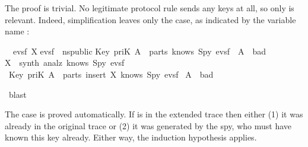 \begin{isabellebody}
\begin{isamarkuptxt}
The proof is trivial.  No legitimate protocol rule sends any keys
at all, so only  is relevant. Indeed, simplification leaves
only the  case, as indicated by the variable name :
\begin{isabelle}%
\ {}{\isachardot}\ {\isasymAnd}evsf\ X{\isachardot}\isanewline
{}evsf\ {\isasymin}\ ns{\isacharunderscore}public{\isacharsemicolon}\isanewline
{}Key\ {\isacharparenleft}priK\ A{\isacharparenright}\ {\isasymin}\ parts\ {\isacharparenleft}knows\ Spy\ evsf{\isacharparenright}{\isacharparenright}\ {\isacharequal}\ {\isacharparenleft}A\ {\isasymin}\ bad{\isacharparenright}{\isacharsemicolon}\isanewline
{}X\ {\isasymin}\ synth\ {\isacharparenleft}analz\ {\isacharparenleft}knows\ Spy\ evsf{\isacharparenright}{\isacharparenright}{\isasymrbrakk}\isanewline
{}\ {\isacharparenleft}Key\ {\isacharparenleft}priK\ A{\isacharparenright}\ {\isasymin}\ parts\ {\isacharparenleft}insert\ X\ {\isacharparenleft}knows\ Spy\ evsf{\isacharparenright}{\isacharparenright}{\isacharparenright}\ {\isacharequal}\isanewline
{}A\ {\isasymin}\ bad{\isacharparenright}%
\end{isabelle}%
\end{isamarkuptxt}%
\isamarkuptrue%
\isamarkupfalse%
\ blast%
\endisatagproof
{\isafoldproof}%
%
\isadelimproof
%
\endisadelimproof
%
\isadelimproof
%
\endisadelimproof
%
\isatagproof
%
\endisatagproof
{\isafoldproof}%
%
\isadelimproof
%
\endisadelimproof
%
\begin{isamarkuptext}%
The  case is proved automatically.  If
 is in the extended trace then either (1) it was already in the
original trace or (2) it was
generated by the spy, who must have known this key already. 
Either way, the induction hypothesis applies.


\end{isamarkuptext}
\end{isabellebody}
